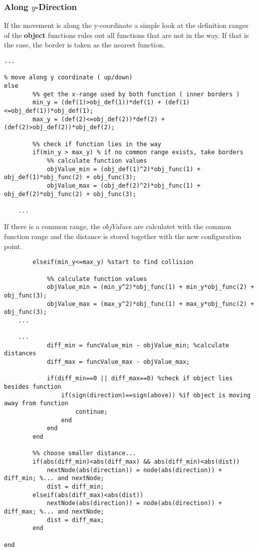 \subsubsection{Along $y$-Direction}
If the movement is along the y-coordinate a simple look at the definition ranges of the \textbf{object} functions rules out all functions that are not in the way.
If that is the case, the border is taken as the nearest function.
\begin{lstlisting}
...

% move along y coordinate ( up/down)
else
        %% get the x-range used by both function ( inner borders )
        min_y = (def(1)>obj_def(1))*def(1) + (def(1)<=obj_def(1))*obj_def(1);
        max_y = (def(2)<=obj_def(2))*def(2) + (def(2)>obj_def(2))*obj_def(2);
        
        %% check if function lies in the way
        if(min_y > max_y) % if no common range exists, take borders
            %% calculate function values
            objValue_min = (obj_def(1)^2)*obj_func(1) + obj_def(1)*obj_func(2) + obj_func(3);
            objValue_max = (obj_def(2)^2)*obj_func(1) + obj_def(2)*obj_func(2) + obj_func(3);
            
    ...
\end{lstlisting}
If there is a common range, the $objValue$s are calculatet with the common function range and the distance is stored together with the new configuration point.
\begin{lstlisting}
        elseif(min_y<=max_y) %start to find collision
            
            %% calculate function values
            objValue_min = (min_y^2)*obj_func(1) + min_y*obj_func(2) + obj_func(3);
            objValue_max = (max_y^2)*obj_func(1) + max_y*obj_func(2) + obj_func(3);
    ...

    ...
            diff_min = funcValue_min - objValue_min; %calculate distances
            diff_max = funcValue_max - objValue_max;
            
            if(diff_min==0 || diff_max==0) %check if object lies besides function
                if(sign(direction)==sign(above)) %if object is moving away from function
                    continue;
                end
            end
        end

        %% choose smaller distance...
        if(abs(diff_min)<abs(diff_max) && abs(diff_min)<abs(dist))
            nextNode(abs(direction)) = node(abs(direction)) + diff_min; %... and nextNode;
            dist = diff_min;
        elseif(abs(diff_max)<abs(dist))
            nextNode(abs(direction)) = node(abs(direction)) + diff_max; %... and nextNode;
            dist = diff_max;
        end
   
end
\end{lstlisting}

